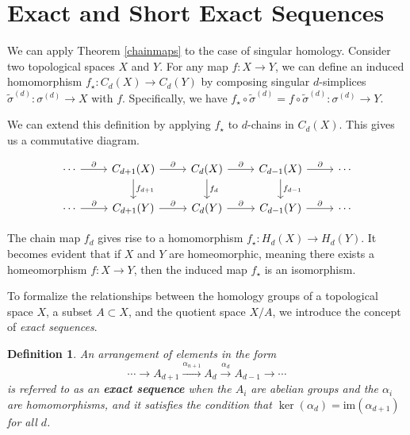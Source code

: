 \documentclass{amsart}
\newtheorem{definition}{Definition}[section]
\begin{document}
\section{Exact and Short Exact Sequences}
We can apply Theorem \ref{chainmaps} to the case of singular homology. Consider two topological spaces $X$ and $Y$. For any map $f: X \rightarrow Y$, we can define an induced homomorphism $f_\star: C_d(X) \rightarrow C_d(Y)$ by composing singular $d$-simplices $\tilde{\sigma}^{(d)}: \sigma^{(d)} \rightarrow X$ with $f$. Specifically, we have $f_\star \circ \tilde{\sigma}^{(d)} = f \circ \tilde{\sigma}^{(d)}: \sigma^{(d)} \rightarrow Y$.

We can extend this definition by applying $f_\star$ to $d$-chains in $C_d(X)$. This gives us a commutative diagram.

\begin{equation}
\begin{tikzcd}
\cdots \arrow[r, "\partial"] & C_{d+1}(X) \arrow[r, "\partial"] \arrow[d, "f_{d+1}"] & C_d(X) \arrow[r, "\partial"] \arrow[d, "f_d"] & C_{d-1}(X) \arrow[r, "\partial"] \arrow[d, "f_{d-1}"] & \cdots \\
\cdots \arrow[r, "\partial"] & C_{d+1}(Y) \arrow[r, "\partial"]                                  & C_d(Y) \arrow[r, "\partial"]                              & C_{d-1}(Y) \arrow[r, "\partial"]                                  & \cdots
\end{tikzcd}
\end{equation}

The chain map $f_d$ gives rise to a homomorphism $f_\star: H_d(X) \rightarrow H_d(Y)$. It becomes evident that if $X$ and $Y$ are homeomorphic, meaning there exists a homeomorphism $f: X \rightarrow Y$, then the induced map $f_\star$ is an isomorphism.

To formalize the relationships between the homology groups of a topological space $X$, a subset $A \subset X$, and the quotient space $X/A$, we introduce the concept of \emph{exact sequences}.

\begin{definition}
An arrangement of elements in the form \begin{equation}
\cdots \rightarrow A_{d+1} \xrightarrow{\alpha_{n+1}} A_{d} \xrightarrow{\alpha_d} A_{d-1} \xrightarrow{} \cdots
\end{equation}
is referred to as an \textbf{exact sequence} when the $A_i$ are abelian groups and the $\alpha_i$ are homomorphisms, and it satisfies the condition that $\ker(\alpha_d) = \text{im}(\alpha_{d+1})$ for all $d$.\end{definition}
\end{document}
